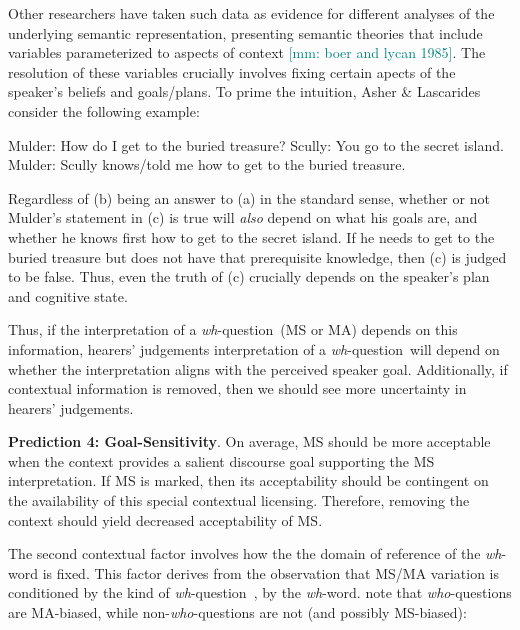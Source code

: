 \documentclass[12pt,letterpaper,table,svgnames,dvipsnames]{article}
\newcommand{\jd}[1]{\textcolor{Purple}{[jd: #1]}}
\newcommand{\mm}[1]{\textcolor{teal}{[mm: #1]}}
\newcommand{\whq}{\emph{wh}-question~}
\begin{document}
Other researchers have taken such data as evidence for different analyses of the underlying semantic representation, presenting semantic theories that include variables parameterized to aspects of context \cite{boerlycan75,ginzburg1995,asherlascarides1998,lahiri2002,vanrooij2003,vanrooij2004}\mm{boer and lycan 1985}. The resolution of these variables crucially involves fixing certain apects of the speaker's beliefs and goals/plans. To prime the intuition, Asher \& Lascarides consider the following example:
\begin{exe}
    \ex 
    \begin{xlist}
        \ex Mulder: How do I get to the buried treasure?
        \ex Scully: You go to the secret island.
        \ex Mulder: Scully knows/told me how to get to the buried treasure.
    \end{xlist}
\end{exe}
Regardless of (b) being an answer to (a) in the standard sense, whether or not Mulder's statement in (c) is true will \emph{also} depend on what his goals are, and whether he knows first how to get to the secret island. If he needs to get to the buried treasure but does not have that prerequisite knowledge, then (c) is judged to be false. Thus, even the truth of (c) crucially depends on the speaker's plan and cognitive state.

Thus, if the interpretation of a \whq (MS or MA) depends on this information, hearers' judgements interpretation of a \whq will depend on whether the interpretation aligns with the perceived speaker goal. Additionally, if contextual information is removed, then we should see more uncertainty in hearers' judgements.

\begin{tcolorbox}[colback=white]
\noindent \textbf{Prediction 4: Goal-Sensitivity}. On average, MS should be more acceptable when the context provides a salient discourse goal supporting the MS interpretation. If MS is marked, then its acceptability should be contingent on the availability of this special contextual licensing. Therefore, removing the context should yield decreased acceptability of MS.
\end{tcolorbox}

The second contextual factor involves how the the domain of reference of the \emph{wh}-word is fixed. This factor derives from the observation that MS/MA variation is conditioned by the kind of \whq, by the \emph{wh}-word.  note that \emph{who}-questions are MA-biased, while non-\emph{who}-questions are not (and possibly MS-biased): 
\end{document}
